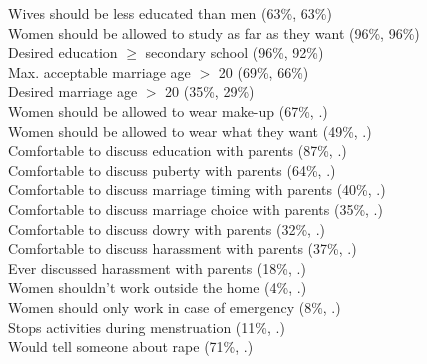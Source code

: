 Wives should be less educated than men (63\%, 63\%) \\
Women should be allowed to study as far as they want (96\%, 96\%) \\
Desired education $\geq$ secondary school (96\%, 92\%) \\
Max. acceptable marriage age $>$ 20 (69\%, 66\%) \\
Desired marriage age $>$ 20 (35\%, 29\%) \\
Women should be allowed to wear make-up (67\%, .) \\
Women should be allowed to wear what they want (49\%, .) \\
Comfortable to discuss education with parents (87\%, .) \\
Comfortable to discuss puberty with parents (64\%, .) \\
Comfortable to discuss marriage timing with parents (40\%, .) \\
Comfortable to discuss marriage choice with parents (35\%, .) \\
Comfortable to discuss dowry with parents (32\%, .) \\
Comfortable to discuss harassment with parents (37\%, .) \\
Ever discussed harassment with parents (18\%, .) \\
Women shouldn't work outside the home (4\%, .) \\
Women should only work in case of emergency (8\%, .) \\
Stops activities during menstruation (11\%, .) \\
Would tell someone about rape (71\%, .) \\